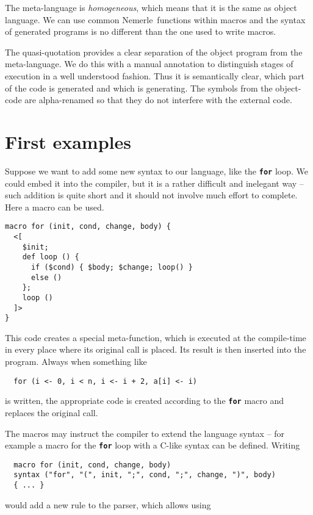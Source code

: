 \documentclass{llncs}
\newcommand{\nem}[0]{Nemerle}
\newcommand{\kw}[1]{{\tt \bf #1}}
\begin{document}
The meta-language is \emph{homogeneous}, which means that it is the same as  
object language. We can use common \nem\ functions within macros and the syntax 
of generated programs is no different than the one used to write macros.

The quasi-quotation provides a clear separation of the object program from 
the meta-language. We do this with a manual annotation to distinguish stages
of execution in a well understood fashion. Thus it is semantically clear, which 
part of the code is generated and which is generating. The symbols from the 
object-code are alpha-renamed so that they do not interfere with the external code. 

\section{First examples}
Suppose we want to add some new syntax to our language, like the \kw{for} loop.
We could embed it into the compiler, but it is a rather difficult and inelegant way -- such 
addition is quite short and it should not involve much effort to complete. 
Here a macro can be used.

\begin{verbatim}
macro for (init, cond, change, body) {
  <[ 
    $init;
    def loop () {
      if ($cond) { $body; $change; loop() } 
      else () 
    }; 
    loop ()
  ]>
}
\end{verbatim}

This code creates a special meta-function, which is executed at the compile-time
in every place where its original call is placed. Its result is then inserted 
into the program. Always when something like

\begin{verbatim}
  for (i <- 0, i < n, i <- i + 2, a[i] <- i)
\end{verbatim}

\noindent
is written, the appropriate code is created according to the \kw{for} macro and 
replaces the original call.

The macros may instruct the compiler to extend the language syntax -- for example 
a macro for the \kw{for} loop with a C-like syntax can be defined. Writing

\begin{verbatim}
  macro for (init, cond, change, body) 
  syntax ("for", "(", init, ";", cond, ";", change, ")", body) 
  { ... }
\end{verbatim}

\noindent
would add a new rule to the parser, which allows using
\end{document}
